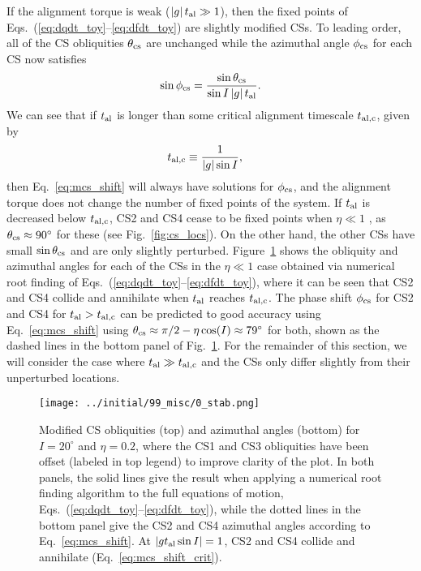 \documentclass[
        fleqn,
        usenatbib,
    ]{mnras}
\newcommand*{\abs}[1]{\left|#1\right|}
\begin{document}
If the alignment torque is weak ($\abs{g}t_{\rm al} \gg 1$), then the fixed
points of Eqs.~(\ref{eq:dqdt_toy}--\ref{eq:dfdt_toy}) are slightly modified CSs.
To leading order, all of the CS obliquities $\theta_{\rm cs}$ are unchanged
while the azimuthal angle $\phi_{\rm cs}$ for each CS now satisfies
\begin{equation}
    \sin \phi_{\rm cs} = \frac{\sin\theta_{\rm cs}}{\sin I \abs{g}t_{\rm al}}.
        \label{eq:mcs_shift}
\end{equation}
We can see that if $t_{\rm al}$ is longer than some critical alignment
timescale $t_{\rm al, c}$, given by
\begin{align}
    t_{\rm al, c} &\equiv \frac{1}{\abs{g}\sin I},\label{eq:mcs_shift_crit}
\end{align}
then Eq.~\eqref{eq:mcs_shift} will always have solutions for $\phi_{\rm cs}$,
and the alignment torque does not change the number of fixed points of the
system. If $t_{\rm al}$ is decreased below $t_{\rm al, c}$, CS2 and CS4 cease to
be fixed points when $\eta \ll 1$ \citep[as first noted in][]{fabrycky_otides},
as $\theta_{\rm cs} \approx 90^\circ$ for these (see Fig.~\ref{fig:cs_locs}). On
the other hand, the other CSs have small $\sin \theta_{\rm cs}$ and are only
slightly perturbed. Figure~\ref{fig:mcs} shows the obliquity and azimuthal
angles for each of the CSs in the $\eta \ll 1$ case obtained via numerical
root finding of Eqs.~(\ref{eq:dqdt_toy}--\ref{eq:dfdt_toy}), where it can be
seen that CS2 and CS4 collide and annihilate when $t_{\rm al}$ reaches $t_{\rm
al, c}$. The phase shift $\phi_{\rm cs}$ for CS2 and CS4 for $t_{\rm al} >
t_{\rm al, c}$ can be predicted to good accuracy using Eq.~\eqref{eq:mcs_shift}
using $\theta_{\rm cs} \approx \pi/2 - \eta \cos (I) \approx 79^\circ$
\citep{su2020} for both, shown as the dashed lines in the bottom panel of
Fig.~\ref{fig:mcs}. For the remainder of this section, we will consider the case
where $t_{\rm al} \gg t_{\rm al, c}$ and the CSs only differ slightly from their
unperturbed locations.
\begin{figure}
    \centering
    \texttt{[image: ../initial/99\_misc/0\_stab.png]}
    \caption{Modified CS obliquities (top) and azimuthal angles (bottom) for $I
    = 20^\circ$ and $\eta = 0.2$, where the CS1 and CS3 obliquities have been
    offset (labeled in top legend) to improve clarity of the plot. In both
    panels, the solid lines give the result when applying a numerical root
    finding algorithm to the full equations of motion,
    Eqs.~(\ref{eq:dqdt_toy}--\ref{eq:dfdt_toy}), while the dotted lines in the
    bottom panel give the CS2 and CS4 azimuthal angles according to
    Eq.~\eqref{eq:mcs_shift}. At $\abs{gt_{\rm al} \sin I} = 1$, CS2 and CS4
    collide and annihilate (Eq.~\ref{eq:mcs_shift_crit}).}\label{fig:mcs}
\end{figure}
\end{document}
